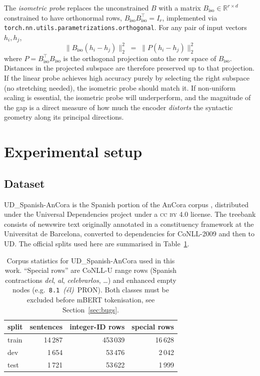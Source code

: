\documentclass[11pt,a4paper]{article}
\newcommand{\ancora}{UD\_Spanish-AnCora\xspace}
\begin{document}
The \emph{isometric probe} replaces the unconstrained $B$ with a
matrix $B_{\text{iso}} \in \mathbb{R}^{r \times d}$ constrained to
have orthonormal rows, $B_{\text{iso}} B_{\text{iso}}^\top = I_r$,
implemented via \texttt{torch.nn.utils.parametrizations.orthogonal}.
For any pair of input vectors $h_i, h_j$,
\begin{equation*}
  \lVert B_{\text{iso}}(h_i - h_j) \rVert_2^2
  \;=\; \lVert P (h_i - h_j) \rVert_2^2
\end{equation*}
where $P = B_{\text{iso}}^\top B_{\text{iso}}$ is the orthogonal
projection onto the row space of $B_{\text{iso}}$. Distances in the
projected subspace are therefore preserved up to that projection.
If the linear probe achieves high accuracy purely by selecting the
right subspace (no stretching needed), the isometric probe should
match it. If non-uniform scaling is essential, the isometric probe
will underperform, and the magnitude of the gap is a direct measure
of how much the encoder \emph{distorts} the syntactic geometry along
its principal directions.

\section{Experimental setup}
\label{sec:setup}

\subsection{Dataset}

\ancora is the Spanish portion of the AnCora corpus \citep{taule2008ancora},
distributed under the Universal Dependencies project under a
\textsc{cc by} 4.0 license. The treebank consists of newswire text
originally annotated in a constituency framework at the Universitat
de Barcelona, converted to dependencies for CoNLL-2009 and then to UD.
The official splits used here are summarised in
Table~\ref{tab:ancora}.

\begin{table}[t]
\centering
\small
\begin{tabular}{lrrr}
\toprule
split & sentences & integer-ID rows & special rows \\
\midrule
train & 14\,287 & 453\,039 & 16\,628 \\
dev   &  1\,654 &  53\,476 &  2\,042 \\
test  &  1\,721 &  53\,622 &  1\,999 \\
\bottomrule
\end{tabular}
\caption{Corpus statistics for \ancora used in this work.
``Special rows'' are CoNLL-U range rows (Spanish contractions
\textit{del}, \textit{al}, \textit{celebrarlos}, \dots) and enhanced
empty nodes (e.g.\ \texttt{8.1}~\textit{(él)}~PRON). Both classes
must be excluded before mBERT tokenisation, see
Section~\ref{sec:bugs}.}
\label{tab:ancora}
\end{table}
\end{document}
